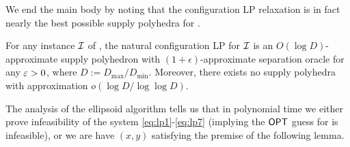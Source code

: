 We end the main body by noting that the configuration LP relaxation is in fact nearly the best possible supply polyhedra for \cckp.

\begin{theorem}\label{thm:conflp}
	For any instance ${\cal I}$ of \cckp, the natural configuration LP for ${\cal I}$ is an $O(\log D)$-approximate supply polyhedron with $(1+\epsilon)$-approximate separation oracle for any $\varepsilon > 0$,
	where $D := D_{\mathrm{max}}/D_\mathrm{min}$. Moreover, there exists no supply polyhedra with approximation $o(\log D/\log \log D)$.
\end{theorem}


\iffalse
The analysis of the ellipsoid algorithm
tells us that in polynomial time we either prove infeasibility of the system \eqref{eq:lp1}-\eqref{eq:lp7} (implying the $\mathsf{OPT}$  guess for \mckc is infeasible), or we
are have $(x,y)$ satisfying the premise of the following lemma.

